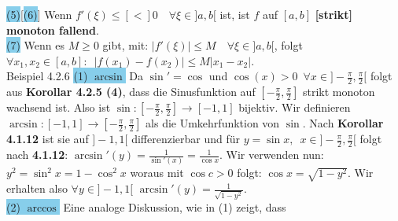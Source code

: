 \documentclass[landscape, 10pt]{article}
\begin{document}
\begin{multicols}{3}
                     \colorbox{SkyBlue}{(5)}[\colorbox{SkyBlue}{(6)}] 
                            Wenn \textcolor{NavyBlue}{
                            $f'(\xi)\leqslant[<]0\quad\forall\xi\in]a,b[$} ist, 
                            ist \textcolor{NavyBlue}{$f$} auf 
                            \textcolor{NavyBlue}{$[a,b]$} 
                            \textbf{[strikt] monoton fallend}.\\
                     \colorbox{SkyBlue}{(7)} Wenn es 
                            \textcolor{NavyBlue}{$M\geqslant0$} gibt, mit: 
                            \textcolor{NavyBlue}{
                            $|f'(\xi)|\leqslant M\quad\forall\xi\in]a,b[$}, 
                            folgt \textcolor{NavyBlue}{ 
                            $\forall x_1,x_2\in[a,b]:\enspace
                            |f(x_1)-f(x_2)|\leqslant M|x_1-x_2|$}. \\
              \colorbox{Dandelion}{Beispiel 4.2.6}
                     \colorbox{SkyBlue}{(1) $\arcsin$} 
                            Da $\sin'=\cos$ und 
                            $\cos(x)>0\enspace
                            \forall x\in]-\frac{\pi}{2},\frac{\pi}{2}[$
                            folgt aus \textbf{Korollar 4.2.5 (4)}, dass die 
                            Sinusfunktion auf
                            $[-\frac{\pi}{2},\frac{\pi}{2}]$ strikt 
                            monoton wachsend
                            ist. Also ist 
                            $\sin:[-\frac{\pi}{2},\frac{\pi}{2}]\longrightarrow[-1,1]$ 
                            bijektiv. Wir definieren
                            $\arcsin:[-1,1]\longrightarrow[-\frac{\pi}{2},\frac{\pi}{2}]$
                            als die Umkehrfunktion von $\sin$. Nach 
                            \textbf{Korollar 4.1.12} 
                            ist sie auf $]-1,1[$ differenzierbar und für
                            $y=\sin x,\enspace x\in]-\frac{\pi}{2},\frac{\pi}{2}[$
                            folgt nach \textbf{4.1.12}:
                            $\arcsin'(y)=\frac{1}{\sin'(x)}=\frac{1}{\cos x}$.
                            Wir verwenden nun: $y^2=\sin^2x=1-\cos^2x$
                            woraus mit $\cos c>0$ folgt:
                            $\cos x=\sqrt{1-y^2}$. Wir erhalten also 
                            $\forall y\in ]-1,1[$
                            $\arcsin'(y)=\frac{1}{\sqrt{1-y^2}}$.\\
                     \colorbox{SkyBlue}{(2) $\arccos$}
                            Eine analoge Diskussion, wie in (1) zeigt, dass

\end{multicols}
\end{document}
